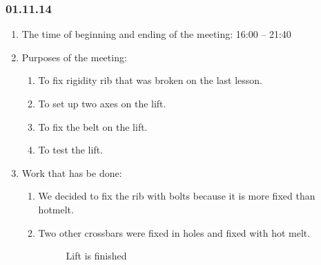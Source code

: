 
\subsubsection{01.11.14}

\begin{enumerate}
	\item The time of beginning and ending of the meeting:
	16:00 – 21:40
	\item Purposes of the meeting:
	\begin{enumerate}
		\item To fix rigidity rib that was broken on the last lesson.
		
		\item To set up two axes on the lift.
		
		\item To fix the belt on the lift.
		
		\item To test the lift.
		
	\end{enumerate}
	
	\item Work that has be done:
	\begin{enumerate}
		\item We decided to fix the rib with bolts because it is more fixed than hotmelt.
		
		\item Two other crossbars were fixed in holes and fixed with hot melt.
		
		\begin{figure}[H]
			\begin{minipage}[h]{1\linewidth}
				\caption{Lift is finished}
			\end{minipage}
		\end{figure}
		

\end{enumerate}
\end{enumerate}
